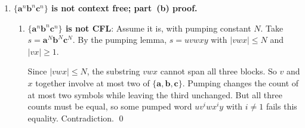 \begin{enumerate}[{10.}1. ]
\begin{enumerate}
\item \textbf{Two-tape automaton for $\{\pmb{a}^n\pmb{b}^n\pmb{c}^n \mid n\geq 1\}$}:
Use the exact strategy described just before Figure~10.6: store the
initial $\pmb{a}$'s on tape~1, match them against the $\pmb{b}$'s while
storing the $\pmb{b}$'s on tape~2, and then match the $\pmb{c}$'s against
tape~2.

Let tape~1 use symbols $Z_1,A$ and tape~2 use symbols $Z_2,B$. Take states
$q_0,q_1,q_2,q_f$, with $q_f$ final, and define the nonempty transitions by
\begin{align*}
\delta(q_0,\pmb{a},Z_1,Z_2)&=\{\langle q_0,AZ_1,Z_2\rangle\}, \\
\delta(q_0,\pmb{a},A,Z_2)&=\{\langle q_0,AA,Z_2\rangle\}, \\
\delta(q_0,\pmb{b},A,Z_2)&=\{\langle q_1,\lambda,BZ_2\rangle\}, \\
\delta(q_1,\pmb{b},A,B)&=\{\langle q_1,\lambda,BB\rangle\}, \\
\delta(q_1,\pmb{c},Z_1,B)&=\{\langle q_2,Z_1,\lambda\rangle\}, \\
\delta(q_2,\pmb{c},Z_1,B)&=\{\langle q_2,Z_1,\lambda\rangle\}, \\
\delta(q_2,\lambda,Z_1,Z_2)&=\{\langle q_f,Z_1,Z_2\rangle\}.
\end{align*}
All other transitions are empty. The first tape counts the $\pmb{a}$'s, the
$\pmb{b}$-phase simultaneously removes one $A$ from tape~1 and places one $B$ on
tape~2, and the $\pmb{c}$-phase removes the $B$'s. The machine reaches $q_f$
exactly when both stacks are back to their bottom symbols after all input has
been consumed, so it accepts precisely $\{\pmb{a}^n\pmb{b}^n\pmb{c}^n \mid n\geq 1\}$.
\end{enumerate}

\item \textbf{$\{\pmb{a}^n\pmb{b}^n\pmb{c}^n\}$ is not context free; part~(b) proof.}

\begin{enumerate}
\item \textbf{$\{\pmb{a}^n\pmb{b}^n\pmb{c}^n\}$ is not CFL}: Assume it is, with pumping constant $N$. Take $s=\pmb{a}^N\pmb{b}^N\pmb{c}^N$. By the pumping lemma, $s=uvwxy$ with $|vwx|\leq N$ and $|vx|\geq 1$.

Since $|vwx|\leq N$, the substring $vwx$ cannot span all three blocks. So $v$ and $x$ together involve at most two of $\{\pmb{a},\pmb{b},\pmb{c}\}$. Pumping changes the count of at most two symbols while leaving the third unchanged. But all three counts must be equal, so some pumped word $uv^i wx^i y$ with $i\neq 1$ fails this equality. Contradiction. \qed


\end{enumerate}
\end{enumerate}
